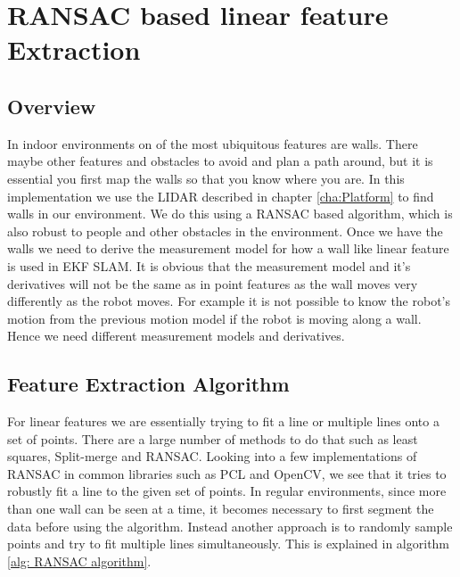 \chapter{RANSAC based linear feature Extraction}

\section{Overview}

In indoor environments on of the most ubiquitous features are walls. There maybe other features and obstacles to avoid and plan a path around, but it is essential you first map the walls so that you know where you are. In this implementation we use the LIDAR described in chapter \ref{cha:Platform} to find walls in our environment. We do this using a RANSAC based algorithm, which is also robust to people and other obstacles in the environment\cite{}. Once we have the walls we need to derive the measurement model for how a wall like linear feature is used in EKF SLAM. It is obvious that the measurement model and it's derivatives will not be the same as in point features as the wall moves very differently as the robot moves. For example it is not possible to know the robot's motion from the previous motion model if the robot is moving along a wall. Hence we need different measurement models and derivatives. 

\section{Feature Extraction Algorithm}

For linear features we are essentially trying to fit a line or multiple lines onto a set of points. There are a large number of methods to do that such as least squares, Split-merge and RANSAC\cite{}. Looking into a few implementations of RANSAC in common libraries such as PCL and OpenCV, we see that it tries to robustly fit a line to the given set of points. In regular environments, since more than one wall can be seen at a time, it becomes necessary to first segment the data before using the algorithm. Instead another approach is to randomly sample points and try to fit multiple lines simultaneously. This   is explained in algorithm \ref{alg: RANSAC algorithm}\cite{}.

